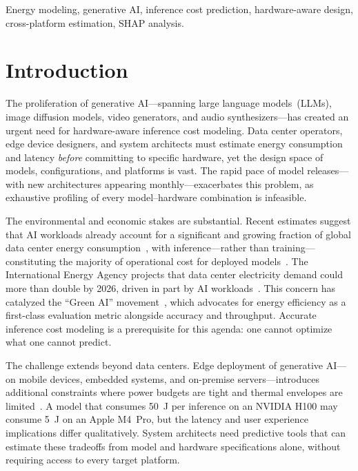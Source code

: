 \documentclass{ieeeaccess}
\begin{document}
\begin{IEEEkeywords}
Energy modeling, generative AI, inference cost prediction, hardware-aware design, cross-platform estimation, SHAP analysis.
\end{IEEEkeywords}

\maketitle



\section{Introduction}
\label{sec:introduction}

The proliferation of generative AI---spanning large language models~(LLMs), image diffusion models, video generators, and audio synthesizers---has created an urgent need for hardware-aware inference cost modeling.
Data center operators, edge device designers, and system architects must estimate energy consumption and latency \emph{before} committing to specific hardware, yet the design space of models, configurations, and platforms is vast.
The rapid pace of model releases---with new architectures appearing monthly---exacerbates this problem, as exhaustive profiling of every model--hardware combination is infeasible.

The environmental and economic stakes are substantial.
Recent estimates suggest that AI workloads already account for a significant and growing fraction of global data center energy consumption~\cite{patterson2021carbon,wu2022sustainable}, with inference---rather than training---constituting the majority of operational cost for deployed models~\cite{desislavov2023trends}.
The International Energy Agency projects that data center electricity demand could more than double by 2026, driven in part by AI workloads~\cite{iea2024electricity}.
This concern has catalyzed the ``Green AI'' movement~\cite{schwartz2020green}, which advocates for energy efficiency as a first-class evaluation metric alongside accuracy and throughput.
Accurate inference cost modeling is a prerequisite for this agenda: one cannot optimize what one cannot predict.

The challenge extends beyond data centers.
Edge deployment of generative AI---on mobile devices, embedded systems, and on-premise servers---introduces additional constraints where power budgets are tight and thermal envelopes are limited~\cite{xu2024survey_edge}.
A model that consumes \SI{50}{\joule} per inference on an NVIDIA H100 may consume \SI{5}{\joule} on an Apple M4~Pro, but the latency and user experience implications differ qualitatively.
System architects need predictive tools that can estimate these tradeoffs from model and hardware specifications alone, without requiring access to every target platform.
\end{document}
